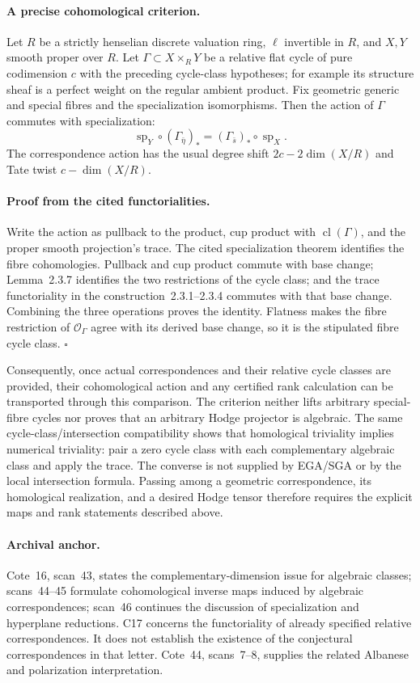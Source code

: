 \paragraph{A precise cohomological criterion.}
Let $R$ be a strictly henselian discrete valuation ring,
$\ell$ invertible in $R$, and $X,Y$ smooth proper over $R$.
Let $\Gamma\subset X\times_RY$ be a relative flat cycle of pure
codimension $c$ with the preceding cycle-class hypotheses; for
example its structure sheaf is a perfect weight on the regular
ambient product. Fix geometric generic and special fibres and the
specialization isomorphisms. Then the action of $\Gamma$ commutes
with specialization:
\[
 \operatorname{sp}_Y\circ(\Gamma_{\bar\eta})_*
       =(\Gamma_{\bar s})_*\circ\operatorname{sp}_X.
\]
The correspondence action has the usual degree shift
$2c-2\dim(X/R)$ and Tate twist $c-\dim(X/R)$.

\paragraph{Proof from the cited functorialities.}
Write the action as pullback to the product, cup product with
$\operatorname{cl}(\Gamma)$, and the proper smooth projection's
trace. The cited specialization theorem identifies the fibre
cohomologies. Pullback and cup product commute with base change;
Lemma~2.3.7 identifies the two restrictions of the cycle class;
and the trace functoriality in the construction~2.3.1--2.3.4
commutes with that base change. Combining the three operations
proves the identity. Flatness makes the fibre restriction of
$\mathcal O_\Gamma$ agree with its derived base change, so it is
the stipulated fibre cycle class. $\square$

Consequently, once actual correspondences and their relative cycle
classes are provided, their cohomological action and any certified
rank calculation can be transported through this comparison. The
criterion neither lifts arbitrary special-fibre cycles nor proves
that an arbitrary Hodge projector is algebraic. The same
cycle-class/intersection compatibility shows that homological
triviality implies numerical triviality: pair a zero cycle class
with each complementary algebraic class and apply the trace.
The converse is not supplied by EGA/SGA or by the local
intersection formula. Passing among a geometric correspondence,
its homological realization, and a desired Hodge tensor therefore
requires the explicit maps and rank statements described above.

\paragraph{Archival anchor.}
Cote~16, scan~43, states the complementary-dimension issue for algebraic
classes; scans~44--45 formulate cohomological inverse maps induced by
algebraic correspondences; scan~46 continues the discussion of
specialization and hyperplane reductions.  C17 concerns the functoriality
of already specified relative correspondences.  It does not establish the
existence of the conjectural correspondences in that letter.  Cote~44,
scans~7--8, supplies the related Albanese and polarization interpretation.
